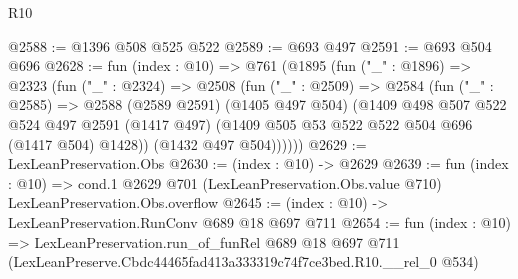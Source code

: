 \begin{lexlean}{R10}
\begin{coremodule}
@2588 := @1396 @508 @525 @522
@2589 := @693 @497
@2591 := @693 @504 @696
@2628 := fun (index : @10) =>
  @761
    (@1895
      (fun ("_" : @1896) =>
      @2323
        (fun ("_" : @2324) =>
        @2508
          (fun ("_" : @2509) =>
          @2584
            (fun ("_" : @2585) =>
            @2588
              (@2589 @2591)
              (@1405 @497 @504)
              (@1409
                @498
                @507
                @522
                @524
                @497
                @2591
                (@1417 @497)
                (@1409 @505 @53 @522 @522 @504 @696 (@1417 @504) @1428))
              (@1432 @497 @504))))))
@2629 := LexLeanPreservation.Obs
@2630 := (index : @10) -> @2629
@2639 := fun (index : @10) =>
  cond.{1} @2629 @701 (LexLeanPreservation.Obs.value @710) LexLeanPreservation.Obs.overflow
@2645 := (index : @10) -> LexLeanPreservation.RunConv @689 @18 @697 @711
@2654 := fun (index : @10) =>
  LexLeanPreservation.run_of_funRel
    @689
    @18
    @697
    @711
    (LexLeanPreserve.Cbdc44465fad413a333319c74f7ce3bed.R10.__rel_0 @534)
\end{coremodule}
\end{lexlean}
